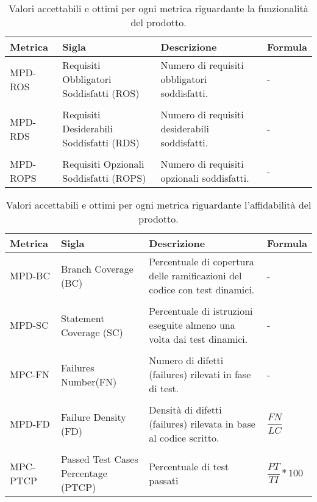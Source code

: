 \begin{table}[H]	
	\centering
	\begin{tabular}{p{2cm} p{3cm} p{6cm} p{4cm}}
		\toprule
		\textbf{Metrica}& \textbf{Sigla} & \textbf{Descrizione} & \textbf{Formula} \\
		\midrule
		MPD-ROS & Requisiti Obbligatori Soddisfatti (ROS) & Numero di requisiti obbligatori soddisfatti. & - \\\\
		MPD-RDS & Requisiti Desiderabili Soddisfatti (RDS) & Numero di requisiti desiderabili soddisfatti. & - \\\\
		MPD-ROPS & Requisiti Opzionali Soddisfatti (ROPS) & Numero di requisiti opzionali soddisfatti. & - \\
		\bottomrule
	\end{tabular}
	\caption{Valori accettabili e ottimi per ogni metrica riguardante la funzionalità del prodotto.}
	\label{table:Valori accettabili e ottimi per ogni metrica riguardante la funzionalità del prodotto.}
\end{table}
\clearpage
{}
\begin{table}[H]	
	\centering
	\begin{tabular}{p{2cm} p{3cm} p{6cm} p{4cm}}
		\toprule
		\textbf{Metrica}& \textbf{Sigla} & \textbf{Descrizione} & \textbf{Formula} \\
		\midrule
		MPD-BC & Branch Coverage (BC) & Percentuale di copertura delle ramificazioni del codice con test dinamici.& -\\\\
		MPD-SC & Statement Coverage (SC) & Percentuale di istruzioni eseguite almeno una volta dai test dinamici. & - \\\\
		MPC-FN & Failures Number(FN) & Numero di difetti (failures) rilevati in fase di test. & - \\\\
		MPD-FD & Failure Density (FD) & Densità di difetti (failures) rilevata in base al codice scritto. & $ \dfrac{FN}{LC} $ \\\\
		MPC-PTCP & Passed Test Cases Percentage (PTCP) & Percentuale di test passati & $ \dfrac{PT}{TI} * 100 $ \\
		\bottomrule
	\end{tabular}
	\caption{Valori accettabili e ottimi per ogni metrica riguardante l’affidabilità del prodotto.}
	\label{table:Valori accettabili e ottimi per ogni metrica riguardante l’affidabilità del prodotto.}
\end{table}


